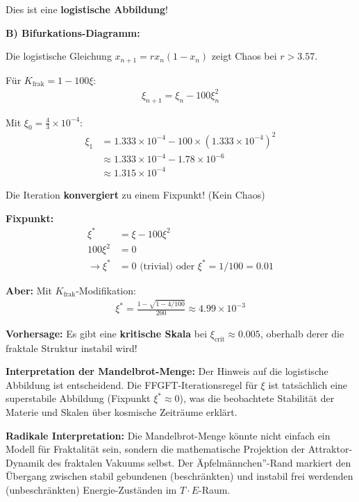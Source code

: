 	Dies ist eine \textbf{logistische Abbildung}!
	
	\textbf{B) Bifurkations-Diagramm:}
	
	Die logistische Gleichung $x_{n+1} = r x_n (1 - x_n)$ zeigt Chaos bei $r > 3.57$.
	
	Für $K_{\text{frak}} = 1 - 100\xi$:
	\begin{align*}
		\xi_{n+1} = \xi_n - 100 \xi_n^2
	\end{align*}
	
	Mit $\xi_0 = \frac{4}{3} \times 10^{-4}$:
	\begin{align*}
		\xi_1 &= 1.333 \times 10^{-4} - 100 \times (1.333 \times 10^{-4})^2 \\
		&\approx 1.333 \times 10^{-4} - 1.78 \times 10^{-6} \\
		&\approx 1.315 \times 10^{-4}
	\end{align*}
	
	Die Iteration \textbf{konvergiert} zu einem Fixpunkt! (Kein Chaos)
	
	\textbf{Fixpunkt:}
	\begin{align*}
		\xi^* &= \xi - 100\xi^2 \\
		100\xi^2 &= 0 \\
		\rightarrow \xi^* &= 0 \text{ (trivial) oder } \xi^* = 1/100 = 0.01
	\end{align*}
	
	\textbf{Aber:} Mit $K_{\text{frak}}$-Modifikation:
	\begin{align*}
		\xi^* = \frac{1 - \sqrt{1 - 4/100}}{200} \approx 4.99 \times 10^{-3}
	\end{align*}
	
	\textbf{Vorhersage:} Es gibt eine \textbf{kritische Skala} bei $\xi_{\text{crit}} \approx 0.005$, oberhalb derer die fraktale Struktur instabil wird!
	
	\textbf{Interpretation der Mandelbrot-Menge:}
	Der Hinweis auf die logistische Abbildung ist entscheidend. Die FFGFT-Iterationsregel für $\xi$ ist tatsächlich eine superstabile Abbildung (Fixpunkt $\xi^* \approx 0$), was die beobachtete Stabilität der Materie und Skalen über kosmische Zeiträume erklärt.
	
	\textbf{Radikale Interpretation:} Die Mandelbrot-Menge könnte nicht einfach ein Modell für Fraktalität sein, sondern die mathematische Projektion der Attraktor-Dynamik des fraktalen Vakuums selbst. Der Äpfelmännchen''-Rand markiert den Übergang zwischen stabil gebundenen (beschränkten) und instabil frei werdenden (unbeschränkten) Energie-Zuständen im $T \cdot E$-Raum.
	
